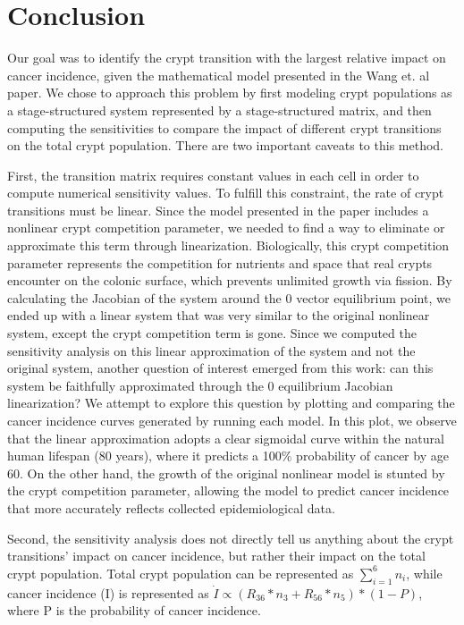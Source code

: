 \section{Conclusion}

Our goal was to identify the crypt transition with the largest relative impact on cancer incidence, given the mathematical model presented in the Wang et. al paper. We chose to approach this problem by first modeling crypt populations as a stage-structured system represented by a stage-structured matrix, and then computing the sensitivities to compare the impact of different crypt transitions on the total crypt population. There are two important caveats to this method.

First, the transition matrix requires constant values in each cell in order to compute numerical sensitivity values. To fulfill this constraint, the rate of crypt transitions must be linear. Since the model presented in the paper includes a nonlinear crypt competition parameter, we needed to find a way to eliminate or approximate this term through linearization. Biologically, this crypt competition parameter represents the competition for nutrients and space that real crypts encounter on the colonic surface, which prevents unlimited growth via fission. By calculating the Jacobian of the system around the 0 vector equilibrium point, we ended up with a linear system that was very similar to the original nonlinear system, except the crypt competition term is gone. Since we computed the sensitivity analysis on this linear approximation of the system and not the original system, another question of interest emerged from this work: can this system be faithfully approximated through the 0 equilibrium Jacobian linearization? We attempt to explore this question by plotting and comparing the cancer incidence curves generated by running each model. In this plot, we observe that the linear approximation adopts a clear sigmoidal curve within the natural human lifespan (80 years), where it predicts a 100\% probability of cancer by age 60. On the other hand, the growth of the original nonlinear model is stunted by the crypt competition parameter, allowing the model to predict cancer incidence that more accurately reflects collected epidemiological data. 

Second, the sensitivity analysis does not directly tell us anything about the crypt transitions’ impact on cancer incidence, but rather their impact on the total crypt population. Total crypt population can be represented as $\sum_{i=1}^{6} n_i$, while cancer incidence (I) is represented as $\dot{I} \propto (R_{36}*n_3 + R_{56}*n_5)*(1-P)$, where P is the probability of cancer incidence.

